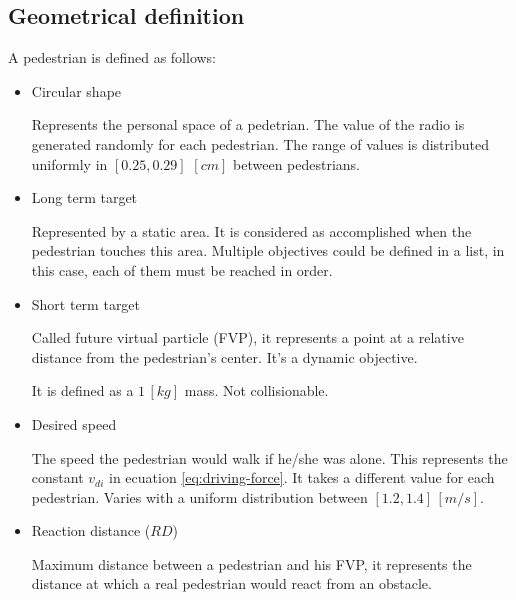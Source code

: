 \documentclass[english]{article}
\begin{document}
\subsection{Geometrical definition}

A pedestrian is defined as follows: 

\begin{itemize}
    \item Circular shape
    
    Represents the personal space of a pedetrian. The value of the radio
    is generated randomly for each pedestrian. The range of values is
    distributed uniformly in $[0.25,0.29]$ $[cm]$ between pedestrians.
    
    \item Long term target
    
    Represented by a static area. It is considered as accomplished when
    the pedestrian touches this area. Multiple objectives could be defined
    in a list, in this case, each of them must be reached in order.
    
    \item Short term target
    
    Called future virtual particle (FVP), it represents a point at a relative
    distance from the pedestrian's center. It's a dynamic objective.
    
    It is defined as a $1\,[kg]$ mass. Not collisionable.
    
    \item Desired speed
    
    The speed the pedestrian would walk if he/she was alone. This represents
    the constant $v_{di}$ in ecuation \ref{eq:driving-force}. It takes
    a different value for each pedestrian. Varies with a uniform distribution
    between $[1.2,1.4]\,[m/s]$.
    
    \item Reaction distance ($RD$)
    
    
    Maximum distance between a pedestrian and his FVP, it represents the
    distance at which a real pedestrian would react from an obstacle.

\end{itemize}

\vspace{1cm}
\end{document}
